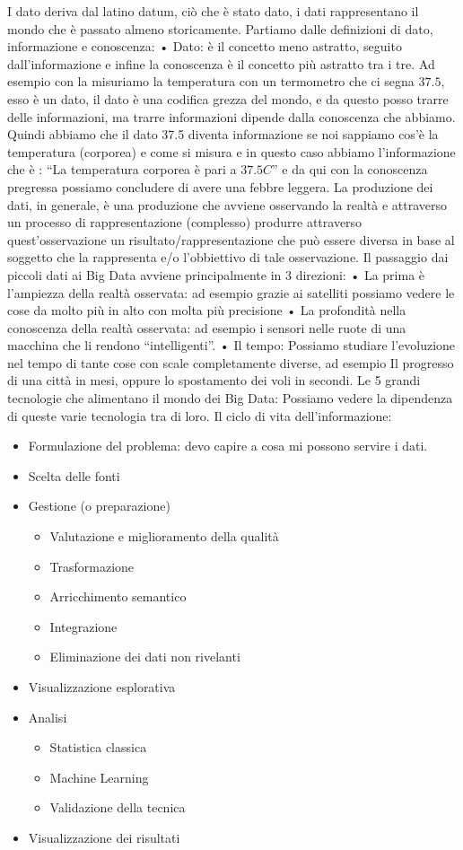 \documentclass[11pt, a4page, twocolumn]{article}
\begin{document}
I dato deriva dal latino datum, ciò che è stato dato, i dati rappresentano il mondo che è passato almeno storicamente. 
Partiamo dalle definizioni di dato, informazione e conoscenza:
    • Dato: è il concetto meno astratto, seguito dall’informazione e infine la conoscenza è il concetto più astratto tra i tre. 
Ad esempio con la misuriamo la temperatura con un termometro che ci segna $37.5$, esso è un dato, il dato è una codifica grezza del mondo, e da questo posso trarre delle informazioni, ma trarre informazioni dipende dalla conoscenza che abbiamo. Quindi abbiamo che il dato 37.5 diventa informazione se noi sappiamo cos’è la temperatura (corporea) e come si misura e in questo caso abbiamo l’informazione che è : “La temperatura corporea è pari a $37.5 C$” e da qui con la conoscenza pregressa possiamo concludere di avere una febbre leggera.
La produzione dei dati, in generale, è una produzione che avviene osservando la realtà e attraverso un processo di rappresentazione (complesso) produrre attraverso quest’osservazione un risultato/rappresentazione che può essere diversa in base al soggetto che la rappresenta e/o l’obbiettivo di tale osservazione.
Il passaggio dai piccoli dati ai Big Data avviene principalmente in 3 direzioni: 
    • La prima è l’ampiezza della realtà osservata: ad esempio grazie ai satelliti possiamo vedere le cose da molto più in alto con molta più precisione
    • La profondità nella conoscenza della realtà osservata: ad esempio i sensori nelle ruote di una macchina che li rendono “intelligenti”.
    • Il tempo: Possiamo studiare l’evoluzione nel tempo di tante cose con scale completamente diverse, ad esempio Il progresso di una città in mesi, oppure lo spostamento dei voli in secondi.
Le 5 grandi tecnologie che alimentano il mondo dei Big Data: 
Possiamo vedere la dipendenza di queste varie tecnologia tra di loro.
Il ciclo di vita dell’informazione:
\begin{itemize}
    \item Formulazione del problema: devo capire a cosa mi possono servire i dati.
    \item Scelta delle fonti
    \item Gestione (o preparazione)
      \begin{itemize}
        \item Valutazione e miglioramento della qualità
        \item Trasformazione
        \item Arricchimento semantico
        \item Integrazione
        \item Eliminazione dei dati non rivelanti
      \end{itemize}
    \item Visualizzazione esplorativa
    \item Analisi
      \begin{itemize}
        \item Statistica classica
        \item Machine Learning
        \item Validazione della tecnica
      \end{itemize}
    \item Visualizzazione dei risultati
\end{itemize}
\end{document}
